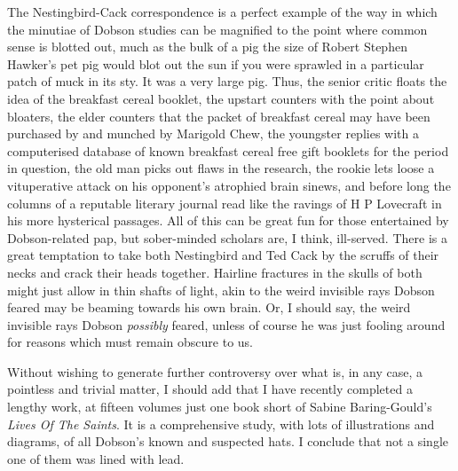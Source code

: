 The Nestingbird-Cack correspondence is a perfect example of the way in which the minutiae of Dobson studies can be magnified to the point where common sense is blotted out, much as the bulk of a pig the size of Robert Stephen Hawker's pet pig would blot out the sun if you were sprawled in a particular patch of muck in its sty. It was a very large pig. Thus, the senior critic floats the idea of the breakfast cereal booklet, the upstart counters with the point about bloaters, the elder counters that the packet of breakfast cereal may have been purchased by and munched by Marigold Chew, the youngster replies with a computerised database of known breakfast cereal free gift booklets for the period in question, the old man picks out flaws in the research, the rookie lets loose a vituperative attack on his opponent's atrophied brain sinews, and before long the columns of a reputable literary journal read like the ravings of H P Lovecraft in his more hysterical passages. All of this can be great fun for those entertained by Dobson-related pap, but sober-minded scholars are, I think, ill-served. There is a great temptation to take both Nestingbird and Ted Cack by the scruffs of their necks and crack their heads together. Hairline fractures in the skulls of both might just allow in thin shafts of light, akin to the weird invisible rays Dobson feared may be beaming towards his own brain. Or, I should say, the weird invisible rays Dobson \emph{possibly} feared, unless of course he was just fooling around for reasons which must remain obscure to us.

Without wishing to generate further controversy over what is, in any case, a pointless and trivial matter, I should add that I have recently completed a lengthy work, at fifteen volumes just one book short of Sabine Baring-Gould's \emph{Lives Of The Saints}. It is a comprehensive study, with lots of illustrations and diagrams, of all Dobson's known and suspected hats. I conclude that not a single one of them was lined with lead.